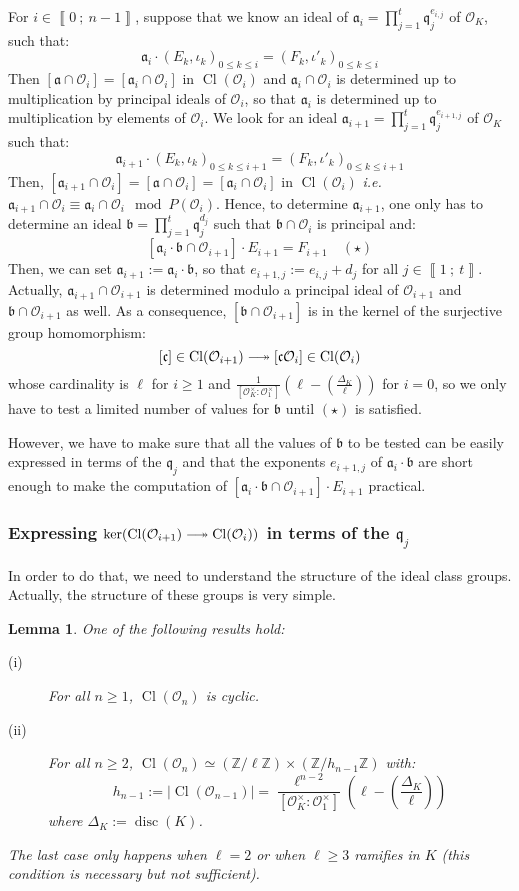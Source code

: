\documentclass[a4paper,10pt]{report}
\theoremstyle{definition}
\theoremstyle{plain}
\newtheorem{lemma}[definition]{Lemma}
\theoremstyle{definition}
\newcommand{\ie}{\emph{i.e.}\ }
\newcommand{\Z}{\mathbb{Z}}
\newcommand{\mO}{\mathcal{O}}
\renewcommand{\i}[2]{\left\llbracket #1~;~#2\right\rrbracket}
\renewcommand{\(}{\left(}
\renewcommand{\)}{\right)}
\newcommand{\mf}[1]{\mathfrak{#1}}
\newcommand{\mfq}{\mathfrak{q}}
\DeclareMathOperator{\disc}{disc}
\DeclareMathOperator{\Cl}{Cl}
\begin{document}
For $i\in\i{0}{n-1}$, suppose that we know an ideal of $\mf{a}_i=\prod_{j=1}^t \mf{q}_j^{e_{i, j}}$ of $\mO_K$, such that: 
\[\mf{a}_i\cdot(E_k, \iota_k)_{0\leq k\leq i}=(F_k,\iota'_k)_{0\leq k\leq i}\]
Then $[\mf{a}\cap \mO_i]=[\mf{a}_i\cap\mO_i]$ in $\Cl(\mO_i)$ and $\mf{a}_i\cap \mO_i$ is determined up to multiplication by principal ideals of $\mO_i$, so that $\mf{a}_i$ is determined up to multiplication by elements of $\mO_i$.  We look for an ideal $\mf{a}_{i+1}=\prod_{j=1}^t \mf{q}_j^{e_{i+1, j}}$ of $\mO_K$ such that:
\[\mf{a}_{i+1}\cdot(E_k, \iota_k)_{0\leq k\leq i+1}=(F_k,\iota'_k)_{0\leq k\leq i+1}\]
Then, $[\mf{a}_{i+1}\cap\mO_{i}]=[\mf{a}\cap \mO_{i}]=[\mf{a}_i\cap\mO_{i}]$ in $\Cl(\mO_{i})$ \ie $\mf{a}_{i+1}\cap\mO_i\equiv \mf{a}_i\cap\mO_i \mod P(\mO_i)$. Hence, to determine $\mf{a}_{i+1}$, one only has to determine an ideal $\mf{b}=\prod_{j=1}^t\mf{q}_j^{d_j}$ such that $\mf{b}\cap\mO_i$ is principal and: 
\[[\mf{a}_i\cdot \mf{b}\cap\mO_{i+1}]\cdot E_{i+1}=F_{i+1} \quad (\star)\]
Then,  we can set $\mf{a}_{i+1}:=\mf{a}_i\cdot \mf{b}$, so that $e_{i+1,j}:=e_{i,j}+d_j$ for all $j\in\i{1}{t}$.  Actually, $\mf{a}_{i+1}\cap\mO_{i+1}$ is determined modulo a principal ideal of $\mO_{i+1}$ and $\mf{b}\cap\mO_{i+1}$ as well. As a consequence,  $[\mf{b}\cap\mO_{i+1}]$ is in the kernel of the surjective group homomorphism:
\[[\mf{c}]\in\Cl(\mO_{i+1})\relbar\joinrel\twoheadrightarrow [\mf{c}\mO_i]\in\Cl(\mO_{i})\]
whose cardinality is $\ell$ for $i\geq 1$ and $\frac{1}{[\mO_K^\times:\mO_1^\times]}\(\ell-\(\frac{\Delta_K}{\ell}\)\)$ for $i=0$, so we only have to test a limited number of values for $\mf{b}$ until $(\star)$ is satisfied.

However, we have to make sure that all the values of $\mf{b}$ to be tested can be easily expressed in terms of the $\mf{q}_j$ and that the exponents $e_{i+1,j}$ of $\mf{a}_i\cdot \mf{b}$ are short enough to make the computation of $[\mf{a}_i\cdot \mf{b}\cap\mO_{i+1}]\cdot E_{i+1}$ practical.  

\subsubsection{Expressing $\ker(\Cl(\mO_{i+1})\relbar\joinrel\twoheadrightarrow\Cl(\mO_{i}))$ in terms of the $\mfq_j$}

In order to do that, we need to understand the structure of the ideal class groups. Actually, the structure of these groups is very simple.

\begin{lemma}
One of the following results hold:

\begin{description}
\item[(i)] For all $n\geq 1$, $\Cl(\mO_n)$ is cyclic.
\item[(ii)] For all $n\geq 2$, $\Cl(\mO_n)\simeq (\Z/\ell\Z)\times(\Z/h_{n-1}\Z)$ with:
\[h_{n-1}:=|\Cl(\mO_{n-1})|=\frac{\ell^{n-2}}{[\mO_K^\times:\mO_1^\times]}\(\ell-\(\frac{\Delta_K}{\ell}\)\)\]
where $\Delta_K:=\disc(K)$.
\end{description}
The last case only happens when $\ell=2$ or when $\ell\geq 3$ ramifies in $K$ (this condition is necessary but not sufficient). 
\end{lemma} 
\end{document}
